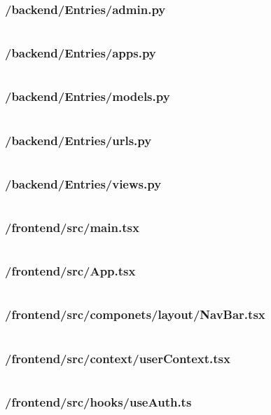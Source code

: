 \subsubsection{/backend/Entries/admin.py}
\inputminted{python3}{SourceCode/backend/Entries/admin.py}
\subsubsection{/backend/Entries/apps.py}
\inputminted{python3}{SourceCode/backend/Entries/apps.py}
\subsubsection{/backend/Entries/models.py}
\inputminted{python3}{SourceCode/backend/Entries/models.py}
\subsubsection{/backend/Entries/urls.py}
\inputminted{python3}{SourceCode/backend/Entries/urls.py}
\subsubsection{/backend/Entries/views.py}
\inputminted{python3}{SourceCode/backend/Entries/views.py}



\subsubsection{/frontend/src/main.tsx}
\inputminted{typescript}{SourceCode/frontend/src/main.tsx}
\subsubsection{/frontend/src/App.tsx}
\inputminted{typescript}{SourceCode/frontend/src/App.tsx}
\subsubsection{/frontend/src/componets/layout/NavBar.tsx}
\inputminted{typescript}{SourceCode/frontend/src/components/layout/NavBar.tsx}
\subsubsection{/frontend/src/context/userContext.tsx}
\inputminted{typescript}{SourceCode/frontend/src/context/userContext.tsx}
\subsubsection{/frontend/src/hooks/useAuth.ts}
\inputminted{typescript}{SourceCode/frontend/src/hooks/useAuth.ts}
